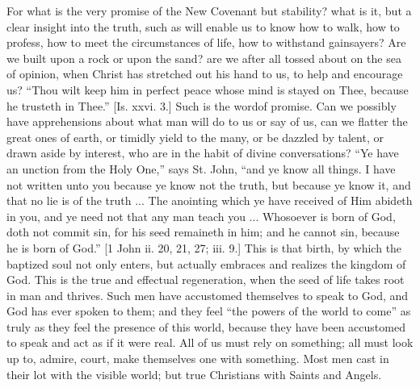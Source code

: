 For what is the very promise of the New Covenant but stability?
what is it, but a clear insight into the truth, such as will enable us
to know how to walk, how to profess, how to meet the circumstances of
life, how to withstand gainsayers? Are we built upon a rock or upon
the sand? are we after all tossed about on the sea of opinion, when
Christ has stretched out his hand to us, to help and encourage us?
``Thou wilt keep him in perfect peace whose mind is stayed on
Thee, because he trusteth in Thee.'' [Is. xxvi. 3.] Such is the
word\emph{}of promise. Can we possibly have apprehensions about what
man will do to us or say of us, can we flatter the great ones of
earth, or timidly yield to the many, or be dazzled by talent, or drawn
aside by interest, who are in the habit of divine conversations?
``Ye have an unction from the Holy One,'' says St. John,
``and ye know all things. I have not written unto you because ye
know not the truth, but because ye know it, and that no lie is of the
truth ... The anointing which ye have received of Him abideth in you,
and ye need not that any man teach you ... Whosoever is born of God,
doth not commit sin, for his seed remaineth in him; and he cannot sin,
because he is born of God.'' [1 John ii. 20, 21, 27; iii. 9.] This
is that birth, by which the baptized soul not only enters, but
actually embraces and realizes the kingdom of God. This is the true
and effectual regeneration, when the seed of life takes root in man
and thrives. Such men have accustomed themselves to speak to God, and
God has ever spoken to them; and they feel ``the powers of the
world to come'' as truly as they feel the presence of this world,
because they have been accustomed to speak and act as if it were real.
All of us must rely on something; all must look up to, admire, court,
make themselves one with something. Most men cast in their lot with
the visible world; but true Christians with Saints and Angels.

